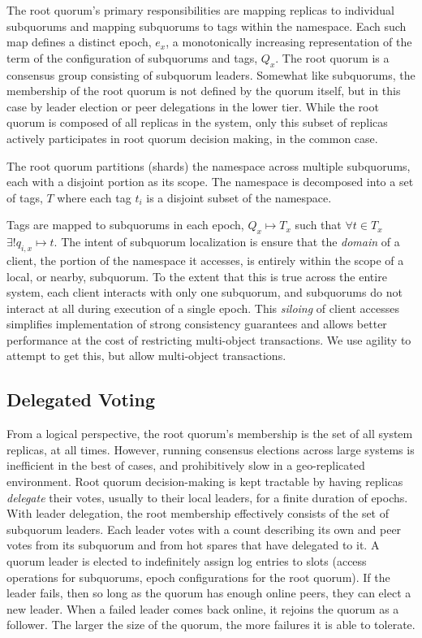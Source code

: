 \documentclass[11pt,conference]{IEEEtran}
\begin{document}
The root quorum's primary responsibilities are mapping replicas to individual
subquorums and mapping subquorums to tags within the namespace.
Each such map defines a distinct epoch, $e_x$, a monotonically increasing
representation of the term of the configuration of subquorums and tags,
$Q_x$.
The root quorum is a consensus group consisting of subquorum leaders.
Somewhat like subquorums, the membership of the root quorum is not defined
by the quorum itself, but in this case by leader election or peer delegations
in the lower tier.
While the root quorum is composed of all replicas in the system, only this
subset of replicas actively participates in root quorum decision making,
in the common case.

The root quorum partitions (shards) the namespace across multiple
subquorums, each with a disjoint portion as its scope.
The namespace is decomposed into a set of tags, $T$ where each tag $t_i$
is a disjoint subset of the namespace.

Tags are mapped to subquorums in each epoch, $Q_x \mapsto T_x$ such that
$\forall t \in T_x$ $\exists! q_{i,x} \mapsto t$.
The intent of subquorum localization is ensure that the \emph{domain} of
a client, the portion of the namespace it accesses, is entirely within
the scope of a local, or nearby, subquorum.
To the extent that this is true across the entire system, each client
interacts with only one subquorum, and subquorums do not interact at all
during execution of a single epoch.
This \emph{siloing} of client accesses simplifies implementation of
strong consistency guarantees and allows better performance at the cost
of restricting multi-object transactions.
We use agility to attempt to get this, but allow multi-object transactions.

\subsection{Delegated Voting}
From a logical perspective, the root quorum's membership is the set of
all system replicas, at all times.
However, running consensus elections across large systems is inefficient
in the best of cases, and prohibitively slow in a geo-replicated
environment.
Root quorum decision-making is kept tractable by having replicas
\emph{delegate} their votes, usually to their local leaders, for a finite
duration of epochs.
With leader delegation, the root membership effectively consists of the
set of subquorum leaders.
Each leader votes with a count describing its own and peer votes from its
subquorum and from hot spares that have delegated to it.
A quorum leader is elected to indefinitely assign log entries to slots
(access operations for subquorums, epoch configurations for the root
quorum).
If the leader fails, then so long as the quorum has enough online peers,
they can elect a new leader.
When a failed leader comes back online, it rejoins the quorum as a
follower.
The larger the size of the quorum, the more failures it is able to
tolerate.
\end{document}
